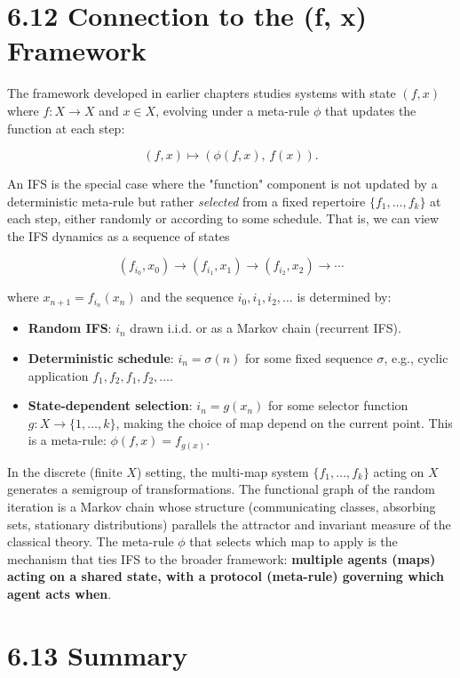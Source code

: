 \section{6.12 Connection to the (f, x) Framework}

The framework developed in earlier chapters studies systems with state $(f, x)$ where $f : X \to X$ and $x \in X$, evolving under a meta-rule $\phi$ that updates the function at each step:

\[
(f, x) \mapsto (\phi(f, x), \, f(x)).
\]

An IFS is the special case where the "function" component is not updated by a deterministic meta-rule but rather \textit{selected} from a fixed repertoire $\{ f_1, \ldots, f_k\} $ at each step, either randomly or according to some schedule. That is, we can view the IFS dynamics as a sequence of states

\[
(f_{i_0}, x_0) \to (f_{i_1}, x_1) \to (f_{i_2}, x_2) \to \cdots
\]

where $x_{n+1} = f_{i_n}(x_n)$ and the sequence $i_0, i_1, i_2, \ldots$ is determined by:

\begin{itemize}
  \item \textbf{Random IFS}: $i_n$ drawn i.i.d. or as a Markov chain (recurrent IFS).
  \item \textbf{Deterministic schedule}: $i_n = \sigma(n)$ for some fixed sequence $\sigma$, e.g., cyclic application $f_1, f_2, f_1, f_2, \ldots$.
  \item \textbf{State-dependent selection}: $i_n = g(x_n)$ for some selector function $g : X \to \{ 1, \ldots, k\} $, making the choice of map depend on the current point. This is a meta-rule: $\phi(f, x) = f_{g(x)}$.
\end{itemize}

In the discrete (finite $X$) setting, the multi-map system $\{ f_1, \ldots, f_k\} $ acting on $X$ generates a semigroup of transformations. The functional graph of the random iteration is a Markov chain whose structure (communicating classes, absorbing sets, stationary distributions) parallels the attractor and invariant measure of the classical theory. The meta-rule $\phi$ that selects which map to apply is the mechanism that ties IFS to the broader framework: \textbf{multiple agents (maps) acting on a shared state, with a protocol (meta-rule) governing which agent acts when}.

\section{6.13 Summary}

